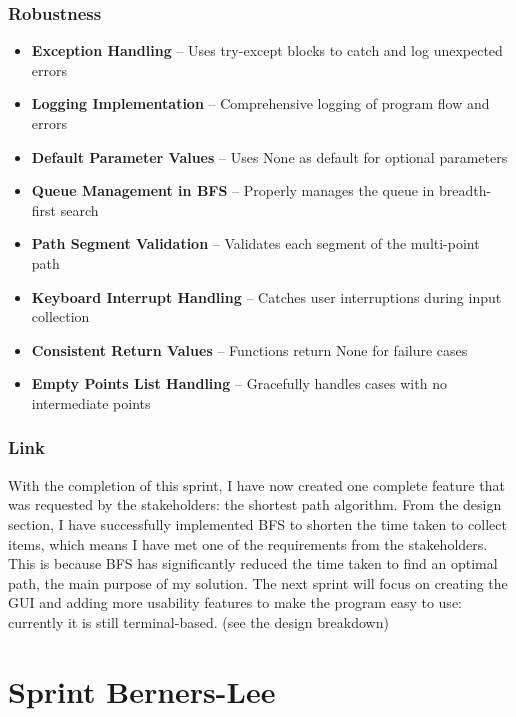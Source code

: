 \subsubsection{Robustness}
\begin{itemize}
    \item \textbf{Exception Handling} -- Uses try-except blocks to catch and log unexpected errors
    \item \textbf{Logging Implementation} -- Comprehensive logging of program flow and errors
    \item \textbf{Default Parameter Values} -- Uses None as default for optional parameters
    \item \textbf{Queue Management in BFS} -- Properly manages the queue in breadth-first search
    \item \textbf{Path Segment Validation} -- Validates each segment of the multi-point path
    \item \textbf{Keyboard Interrupt Handling} -- Catches user interruptions during input collection
    \item \textbf{Consistent Return Values} -- Functions return None for failure cases
    \item \textbf{Empty Points List Handling} -- Gracefully handles cases with no intermediate points
\end{itemize}


\subsubsection{Link}

With the completion of this sprint, I have now created one complete feature that was requested by the stakeholders: the shortest path algorithm. From the design section, I have successfully implemented BFS to shorten the time taken to collect items, which means I have met one of the requirements from the stakeholders. This is because BFS has significantly reduced the time taken to find an optimal path, the main purpose of my solution. \newline The next sprint will focus on creating the GUI and adding more usability features to make the program easy to use: currently it is still terminal-based. (see the design breakdown)


\clearpage


\section{Sprint Berners-Lee}

